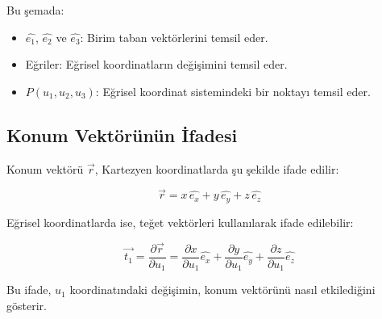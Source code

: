 \documentclass[11pt,letterpaper,twocolumn]{fenbil}
\begin{document}
Bu şemada:

\begin{itemize}
    \item $\hat{e_1}$, $\hat{e_2}$ ve $\hat{e_3}$: Birim taban vektörlerini temsil eder.
    \item Eğriler: Eğrisel koordinatların değişimini temsil eder.
    \item $P(u_1, u_2, u_3)$: Eğrisel koordinat sistemindeki bir noktayı temsil eder.
\end{itemize}

\subsection{Konum Vektörünün İfadesi}

Konum vektörü $\vec{r}$, Kartezyen koordinatlarda şu şekilde ifade edilir:

\begin{equation}
\vec{r} = x \, \hat{e_x} + y \, \hat{e_y} + z \, \hat{e_z}
\end{equation}

Eğrisel koordinatlarda ise, teğet vektörleri kullanılarak ifade edilebilir:

\begin{equation}
\vec{t_1} = \frac{\partial \vec{r}}{\partial u_1} = \frac{\partial x}{\partial u_1} \hat{e_x} + \frac{\partial y}{\partial u_1} \hat{e_y} + \frac{\partial z}{\partial u_1} \hat{e_z}
\end{equation}

Bu ifade, $u_1$ koordinatındaki değişimin, konum vektörünü nasıl etkilediğini gösterir.
\end{document}
